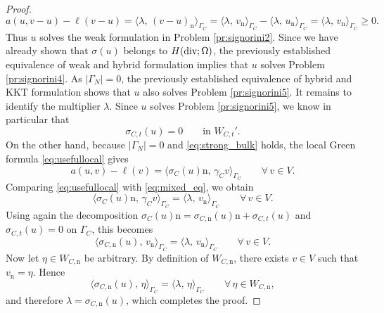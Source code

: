 \begin{proof}
	\begin{equation*}
		a(u,v-u)-\ell(v-u)=\langle \lambda,\,(v-u)_{\mathrm n}\rangle_{\Gamma_C}=\langle \lambda,\,v_{\mathrm n}\rangle_{\Gamma_C} - \langle \lambda,\,u_{\mathrm n}\rangle_{\Gamma_C} = \langle \lambda,\,v_{\mathrm n}\rangle_{\Gamma_C}
		\ge 0.
	\end{equation*}
	Thus $u$ solves the weak formulation in Problem \ref{pr:signorini2}. Since we have already shown that $\sigma(u)$ belongs to $H(\diver;\Omega)$, the previously established equivalence of weak and hybrid formulation implies that $u$ solves Problem \ref{pr:signorini4}. As $|\Gamma_N|=0$, the previously established equivalence of hybrid and KKT formulation shows that $u$ also solves Problem \ref{pr:signorini5}. It remains to identify the multiplier $\lambda$. Since $u$ solves Problem \ref{pr:signorini5}, we know in particular that
	\begin{equation*}
		\sigma_{C,t}(u)=0
		\qquad\text{in }W_{C,t}'.
	\end{equation*}
	On the other hand, because $|\Gamma_N|=0$ and \eqref{eq:strong_bulk} holds, the local Green formula \eqref{eq:usefullocal} gives
	\begin{equation*}
		a(u,v)-\ell(v)
		=
		\langle \sigma_C(u)\mathrm n,\,\gamma_C v\rangle_{\Gamma_C}
		\qquad\forall\,v\in V.
	\end{equation*}
	Comparing \eqref{eq:usefullocal} with \eqref{eq:mixed_eq}, we obtain
	\begin{equation*}
		\langle \sigma_C(u)\mathrm n,\,\gamma_C v\rangle_{\Gamma_C}
		=
		\langle \lambda,\,v_{\mathrm n}\rangle_{\Gamma_C}
		\qquad\forall\,v\in V.
	\end{equation*}
	Using again the decomposition $\sigma_C(u)\mathrm{n} = \sigma_{C, \mathrm n}(u)\mathrm{n}+\sigma_{C,t}(u)$ and $\sigma_{C,t}(u)=0$ on $\Gamma_C$, this becomes
	\begin{equation*}
		\langle \sigma_{C, \mathrm n}(u),\,v_{\mathrm n}\rangle_{\Gamma_C}
		=
		\langle \lambda,\,v_{\mathrm n}\rangle_{\Gamma_C}
		\qquad\forall\,v\in V.
	\end{equation*}
	Now let $\eta\in W_{C,\mathrm n}$ be arbitrary. By definition of $W_{C,\mathrm n}$, there exists $v\in V$ such that $v_{\mathrm n}=\eta$. Hence
	\begin{equation*}
		\langle \sigma_{C, \mathrm n}(u),\,\eta\rangle_{\Gamma_C}
		=
		\langle \lambda,\,\eta\rangle_{\Gamma_C}
		\qquad\forall\,\eta\in W_{C,\mathrm n},
	\end{equation*}
	and therefore $\lambda=\sigma_{C, \mathrm n}(u)$, which completes the proof.
\end{proof}